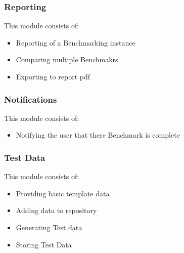 \subsubsection{Reporting}
This module consists of:
\begin{itemize}
  \item Reporting of a Benchmarking instance
  \item Comparing multiple Benchmakrs
  \item Exporting to report pdf
\end{itemize}

\subsubsection{Notifications}
This module consists of:
\begin{itemize}
  \item Notifying the user that there Benchmark is complete
\end{itemize}

\subsubsection{Test Data}
This module consists of:
\begin{itemize}
  \item Providing basic template data
  \item Adding data to repository
  \item Generating Test data
  \item Storing Test Data
\end{itemize}
